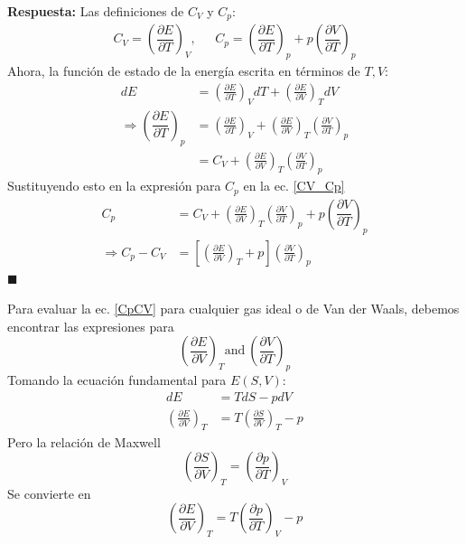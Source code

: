\documentclass[]{article}
\numberwithin{equation}{section}
\newcommand{\0}{\textcolor{gray}{0}}
\newcommand{\deriv}[3]{\left(\frac{\partial #1}{\partial #2} \right)_{#3}}
\newcommand{\dderiv}[3]{\left(\dfrac{\partial #1}{\partial #2} \right)_{#3}}
\newcommand{\qed}{\hfill\(\blacksquare\)}
\begin{document}
\textbf{Respuesta:}
Las definiciones de \(C_V\) y \(C_p\):
\begin{equation}
	\begin{matrix}
		C_V = \dderiv{E}{T}{V}, \ \ \ & 
		C_p = \dderiv{E}{T}{p} + p\dderiv{V}{T}{p}
	\end{matrix}\label{CV_Cp}
\end{equation}
Ahora, la función de estado de la energía escrita en términos de \(T,V\):
\begin{align*}
	d E &= \deriv{E}{T}{V}dT + \deriv{E}{V}{T}dV\\
	\Rightarrow \dderiv{E}{T}{p} &= \deriv{E}{T}{V} + \deriv{E}{V}{T}\deriv{V}{T}{p}\\
	&= C_V + \deriv{E}{V}{T}\deriv{V}{T}{p}
\end{align*}
Sustituyendo esto en la expresión para \(C_p\) en la ec. \ref{CV_Cp}
\begin{align}
	C_p &= C_V + \deriv{E}{V}{T}\deriv{V}{T}{p} + p\dderiv{V}{T}{p}\nonumber\\
	\Rightarrow C_p - C_V &= \left[ \deriv{E}{V}{T} + p\right] \deriv{V}{T}{p}\label{CpCV}
\end{align}
\qed

Para evaluar la ec. \ref{CpCV} para cualquier gas ideal o de Van der Waals, debemos encontrar las expresiones para
\begin{equation*}
	\deriv{E}{V}{T}\mathrm{ and }\ \deriv{V}{T}{p}
\end{equation*}
Tomando la ecuación fundamental para \(E(S,V)\):
\begin{align}
	dE &= T dS - p dV\label{fundamental_E_SV}\\
	\deriv{E}{V}{T} &= T \deriv{S}{V}{T} - p\nonumber	
\end{align}
Pero la relación de Maxwell
\begin{equation}
	\deriv{S}{V}{T} = \deriv{p}{T}{V} \label{SVT_pTV}
\end{equation}
Se convierte en
\begin{equation}
	\deriv{E}{V}{T} = T \deriv{p}{T}{V} - p\label{1.28_EVT}
\end{equation}
\end{document}
